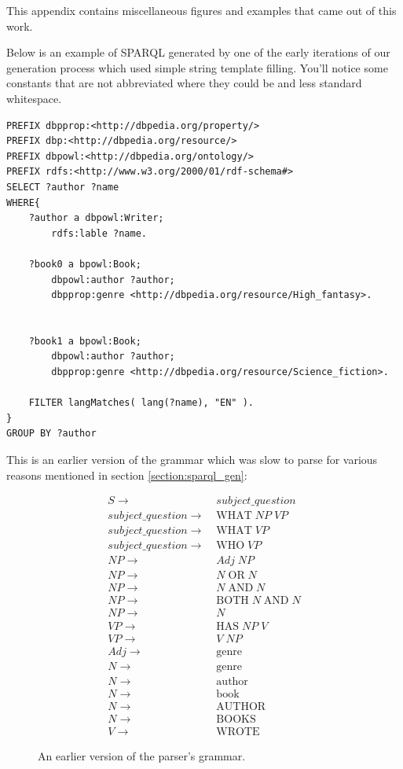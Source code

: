 \documentclass[11pt]{article}
\begin{document}
This appendix contains miscellaneous figures and examples that came out of this work.

Below is an example of SPARQL generated by one of the early iterations of our generation process
which used simple string template filling. You'll notice some constants that are
not abbreviated where they could be and less standard whitespace.

\begin{verbatim}
PREFIX dbpprop:<http://dbpedia.org/property/>
PREFIX dbp:<http://dbpedia.org/resource/>
PREFIX dbpowl:<http://dbpedia.org/ontology/>
PREFIX rdfs:<http://www.w3.org/2000/01/rdf-schema#>
SELECT ?author ?name
WHERE{
    ?author a dbpowl:Writer;
        rdfs:lable ?name.

    ?book0 a bpowl:Book;
        dbpowl:author ?author;
        dbpprop:genre <http://dbpedia.org/resource/High_fantasy>.


    ?book1 a bpowl:Book;
        dbpowl:author ?author;
        dbpprop:genre <http://dbpedia.org/resource/Science_fiction>.

    FILTER langMatches( lang(?name), "EN" ).
}
GROUP BY ?author
\end{verbatim}


This is an earlier version of the grammar which was slow to parse for
various reasons mentioned in section \ref{section:sparql_gen}:
\begin{figure}[h!]
\setcounter{equation}{0}
\begin{align}
S \rightarrow\; & subject\_question \\
subject\_question \rightarrow\; & \text{WHAT} \; NP \; VP \\
subject\_question \rightarrow\; & \text{WHAT} \; VP \\
subject\_question \rightarrow\; & \text{WHO} \; VP \\
NP \rightarrow\; & Adj \; NP \\
NP \rightarrow\; & N \; \text{OR} \; N \\
NP \rightarrow\; & N \; \text{AND} \; N \\
NP \rightarrow\; & \text{BOTH} \; N \; \text{AND} \; N \\
NP \rightarrow\; & N\\
VP \rightarrow\; & \text{HAS} \; NP \; V \\
VP \rightarrow\; & V \; NP \\
Adj \rightarrow\; & \text{genre} \\
N \rightarrow\; & \text{genre} \\
N \rightarrow\; & \text{author} \\
N \rightarrow\; & \text{book} \\
N \rightarrow\; & \text{AUTHOR} \\
N \rightarrow\; & \text{BOOKS} \\
V \rightarrow\; & \text{WROTE}
\end{align}

\caption{An earlier version of the parser's grammar.}
\label{fig:slow_grammar}
\end{figure}
\end{document}
